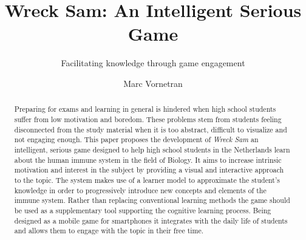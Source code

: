 \documentclass[sigconf]{acmart}
\begin{document}
\title{Wreck Sam: An Intelligent Serious Game}
\subtitle{Facilitating knowledge through game engagement}

\author{Marc Vornetran}



\begin{abstract}
Preparing for exams and learning in general is hindered when high school students suffer from low motivation and boredom. These problems stem from students feeling disconnected from the study material when it is too abstract, difficult to visualize and not engaging enough. This paper proposes the development of \textit{Wreck Sam} an intelligent, serious game designed to help high school students in the Netherlands learn about the human immune system in the field of Biology. It aims to increase intrinsic motivation and interest in the subject by providing a visual and interactive approach to the topic. The system makes use of a learner model to approximate the student's knowledge in order to progressively introduce new concepts and elements of the immune system. Rather than replacing conventional learning methods the game should be used as a supplementary tool supporting the cognitive learning process. Being designed as a mobile game for smartphones it integrates with the daily life of students and allows them to engage with the topic in their free time.
\end{abstract}


\maketitle






\end{document}
